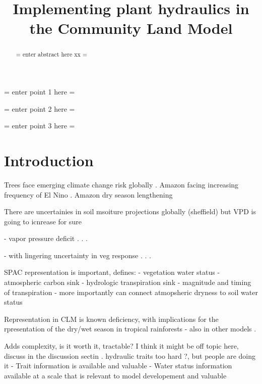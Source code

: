 \documentclass[draft,linenumbers]{agujournal}
\begin{document}
\title{Implementing plant hydraulics in the Community Land Model}



\begin{keypoints}
\item = enter point 1 here = 
\item = enter point 2 here = 
\item = enter point 3 here = 
\end{keypoints}


\begin{abstract}
= enter abstract here xx =
\end{abstract}


\section{Introduction}

Trees face emerging climate change risk globally \citep{allen2010,anderegg2013b}.
Amazon facing increasing frequency of El Nino \citep{cai2014}.
Amazon dry season lengthening \citep{fu2013}


\citep{cook2015}
     
There are uncertainies in soil msoiture projections globally (sheffield) but VPD is going to icnrease for sure

 - vapor pressure deficit 
      . \citep{mcdowell2015}
      . \citep{novick2016b}
      . \citep{williams2013}

 - with lingering uncertainty in veg response
      . \citep{dekauwe2017}
      . \citep{friedlingstein2014}
      . \citep{anderegg2015b}


SPAC representation is important, defines:
  - vegetation water status
  - atmospheric carbon sink
  - hydrologic transpiration sink
  - magnitude and timing of transpiration
  - more importantly can connect atmopsheric dryness to soil water status

Representation in CLM is known deficiency, with implications for the rpresentation of the dry/wet season in tropical rainforests
  - also in other models
      . \citep{powell2013,ukkola2016}


Adds complexity, is it worth it, tractable? I think it might be off topic here, discuss in the discussion sectin
       . hydraulic traits too hard \citep{drake2017}?, but people are doing it \citep{xu2016,christoffersen2016}
  - Trait information is available \citep{kattge2011,anderegg2015a} and valuable \citep{choat2012}
  - Water status information available at a scale that is relevant to model developement \citep{konings2016,grant2016} and valuable \citep{momen2017,konings2017b}
\end{document}
